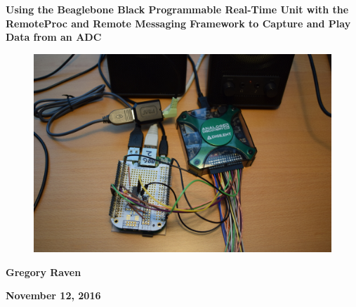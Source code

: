 \thispagestyle{empty}
{\centering\bfseries\color{black}\Huge
Using the Beaglebone Black Programmable Real-Time Unit with the RemoteProc and Remote Messaging Framework to Capture and Play Data from an ADC
\par}

\bigskip

\begin{figure}
	\centering
	\includegraphics[width=\textwidth]{photos/DSC_0021}
\end{figure}

\bigskip
{\centering\bfseries\Large
Gregory Raven
\par}


\bigskip
{\centering\bfseries\LARGE
November 12, 2016
\par}



